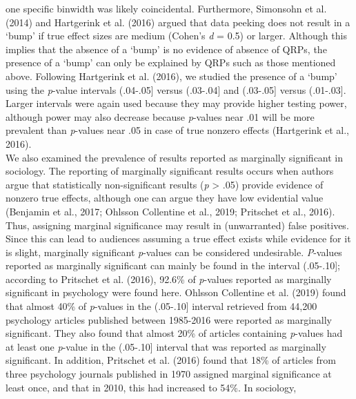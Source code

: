 \documentclass[
  12pt,
]{article}
\begin{document}
one specific binwidth was likely coincidental. Furthermore, Simonsohn et
al. (2014) and Hartgerink et al. (2016) argued that data peeking does
not result in a `bump' if true effect sizes are medium (Cohen's \emph{d}
= 0.5) or larger. Although this implies that the absence of a `bump' is
no evidence of absence of QRPs, the presence of a `bump' can only be
explained by QRPs such as those mentioned above. Following Hartgerink et
al. (2016), we studied the presence of a `bump' using the \emph{p}-value
intervals (.04-.05{]} versus (.03-.04{]} and (.03-.05{]} versus
(.01-.03{]}. Larger intervals were again used because they may provide
higher testing power, although power may also decrease because
\emph{p}-values near .01 will be more prevalent than \emph{p}-values
near .05 in case of true nonzero effects (Hartgerink et al., 2016).\\
\hspace*{0.333em}\hspace*{0.333em}\hspace*{0.333em}\hspace*{0.333em}We
also examined the prevalence of results reported as marginally
significant in sociology. The reporting of marginally significant
results occurs when authors argue that statistically non-significant
results (\emph{p} \textgreater{} .05) provide evidence of nonzero true
effects, although one can argue they have low evidential value (Benjamin
et al., 2017; Ohlsson Collentine et al., 2019; Pritschet et al., 2016).
Thus, assigning marginal significance may result in (unwarranted) false
positives. Since this can lead to audiences assuming a true effect
exists while evidence for it is slight, marginally significant
\emph{p}-values can be considered undesirable. \emph{P}-values reported
as marginally significant can mainly be found in the interval
(.05-.10{]}; according to Pritschet et al. (2016), 92.6\% of
\emph{p}-values reported as marginally significant in psychology were
found here. Ohlsson Collentine et al. (2019) found that almost 40\% of
\emph{p}-values in the (.05-.10{]} interval retrieved from 44,200
psychology articles published between 1985-2016 were reported as
marginally significant. They also found that almost 20\% of articles
containing \emph{p}-values had at least one \emph{p}-value in the
(.05-.10{]} interval that was reported as marginally significant. In
addition, Pritschet et al. (2016) found that 18\% of articles from three
psychology journals published in 1970 assigned marginal significance at
least once, and that in 2010, this had increased to 54\%. In sociology,
\end{document}
